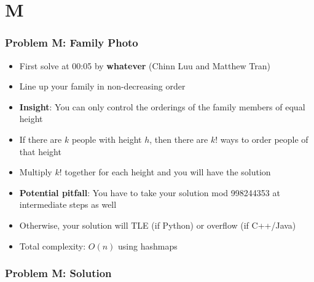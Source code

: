 \section{M}%
\label{sec:m}

\begin{frame}
  \frametitle{Problem M: Family Photo}

  \begin{itemize}
    \item First solve at 00:05 by \textbf{whatever} (Chinn Luu and Matthew Tran)
    \item Line up your family in non-decreasing order
    \item \textbf{Insight}: You can only control the orderings of the family members of equal height
    \item If there are $k$ people with height $h$, then there are $k!$ ways to order people of that height
    \item Multiply $k!$ together for each height and you will have the solution
    \item \textbf{Potential pitfall}: You have to take your solution mod 998244353 at intermediate steps as well
    \item Otherwise, your solution will TLE (if Python) or overflow (if C++/Java)
    \item Total complexity: $O(n)$ using hashmaps
  \end{itemize}
\end{frame}

\begin{frame}
  \frametitle{Problem M: Solution}
\end{frame}

